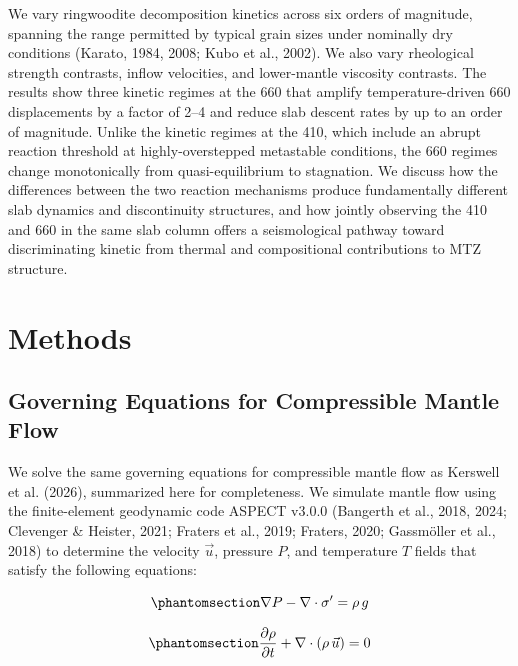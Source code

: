 \documentclass[draft,linenumbers]{agujournal2019}
\begin{document}
We vary ringwoodite decomposition kinetics across six orders of
magnitude, spanning the range permitted by typical grain sizes under
nominally dry conditions (Karato, 1984, 2008; Kubo et al., 2002). We
also vary rheological strength contrasts, inflow velocities, and
lower-mantle viscosity contrasts. The results show three kinetic regimes
at the 660 that amplify temperature-driven 660 displacements by a factor
of 2--4 and reduce slab descent rates by up to an order of magnitude.
Unlike the kinetic regimes at the 410, which include an abrupt reaction
threshold at highly-overstepped metastable conditions, the 660 regimes
change monotonically from quasi-equilibrium to stagnation. We discuss
how the differences between the two reaction mechanisms produce
fundamentally different slab dynamics and discontinuity structures, and
how jointly observing the 410 and 660 in the same slab column offers a
seismological pathway toward discriminating kinetic from thermal and
compositional contributions to MTZ structure.

\section{Methods}\label{sec:methods}

\subsection{Governing Equations for Compressible Mantle
Flow}\label{sec:governing-equations-for-compressible-mantle-flow}

We solve the same governing equations for compressible mantle flow as
Kerswell et al. (2026), summarized here for completeness. We simulate
mantle flow using the finite-element geodynamic code ASPECT v3.0.0
(Bangerth et al., 2018, 2024; Clevenger \& Heister, 2021; {Fraters et
al.}, 2019; Fraters, 2020; Gassmöller et al., 2018) to determine the
velocity \(\vec{u}\), pressure \(P\), and temperature \(T\) fields that
satisfy the following equations:

\begin{equation}\protect\phantomsection\label{eq:navier-stokes-no-inertia}{
  \nabla P - \nabla \cdot \sigma^{\prime} = \rho\, g
}\end{equation}

\begin{equation}\protect\phantomsection\label{eq:continuity-compressible}{
  \frac{\partial \rho}{\partial t} + \nabla \cdot (\rho\, \vec{u}) = 0
}\end{equation}
\end{document}
